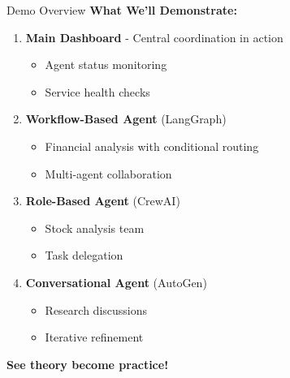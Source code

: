 \documentclass[aspectratio=169,11pt]{beamer}
\begin{document}
\begin{frame}{Demo Overview}
\textbf{What We'll Demonstrate:}

\begin{enumerate}
    \item \textbf{Main Dashboard} - Central coordination in action
    \begin{itemize}
        \item Agent status monitoring
        \item Service health checks
    \end{itemize}
    
    \item \textbf{Workflow-Based Agent} (LangGraph)
    \begin{itemize}
        \item Financial analysis with conditional routing
        \item Multi-agent collaboration
    \end{itemize}
    
    \item \textbf{Role-Based Agent} (CrewAI)
    \begin{itemize}
        \item Stock analysis team
        \item Task delegation
    \end{itemize}
    
    \item \textbf{Conversational Agent} (AutoGen)
    \begin{itemize}
        \item Research discussions
        \item Iterative refinement
    \end{itemize}
\end{enumerate}

\vspace{0.3cm}
\begin{center}
\textbf{See theory become practice!}
\end{center}
\end{frame}
\end{document}
